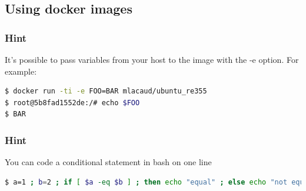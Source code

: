 \documentclass[a4paper,11pt]{exam}
\begin{document}
\subsection{Using docker images}

\subsubsection*{Hint}
It's possible to pass variables from your host to the image with the -e option. For example:

\begin{lstlisting}[frame=single,language={sh}]
$ docker run -ti -e FOO=BAR mlacaud/ubuntu_re355
$ root@5b8fad1552de:/# echo $FOO
$ BAR
\end{lstlisting}

\subsubsection*{Hint}
You can code a conditional statement in bash on one line

\begin{lstlisting}[frame=single,language={sh}]
$ a=1 ; b=2 ; if [ $a -eq $b ] ; then echo "equal" ; else echo "not equal" ; fi
\end{lstlisting}
\end{document}
